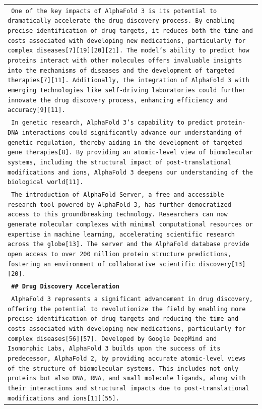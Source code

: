 \documentclass[11pt]{article}
\begin{document}
\begin{longtable}{p{\textwidth}}
\texttt{\small{ One of the key impacts of AlphaFold 3 is its potential to dramatically accelerate the drug discovery process. By enabling precise identification of drug targets, it reduces both the time and costs associated with developing new medications, particularly for complex diseases[7][19][20][21]. The model's ability to predict how proteins interact with other molecules offers invaluable insights into the mechanisms of diseases and the development of targeted therapies[7][11]. Additionally, the integration of AlphaFold 3 with emerging technologies like self-driving laboratories could further innovate the drug discovery process, enhancing efficiency and accuracy[9][11]. }} \\
\texttt{\small{ In genetic research, AlphaFold 3's capability to predict protein-DNA interactions could significantly advance our understanding of genetic regulation, thereby aiding in the development of targeted gene therapies[8]. By providing an atomic-level view of biomolecular systems, including the structural impact of post-translational modifications and ions, AlphaFold 3 deepens our understanding of the biological world[11]. }} \\
\texttt{\small{ The introduction of AlphaFold Server, a free and accessible research tool powered by AlphaFold 3, has further democratized access to this groundbreaking technology. Researchers can now generate molecular complexes with minimal computational resources or expertise in machine learning, accelerating scientific research across the globe[13]. The server and the AlphaFold database provide open access to over 200 million protein structure predictions, fostering an environment of collaborative scientific discovery[13][20]. }} \\
\vspace{1pt}
\texttt{\small{\textbf{ \#\# Drug Discovery Acceleration }}} \\
\texttt{\small{ AlphaFold 3 represents a significant advancement in drug discovery, offering the potential to revolutionize the field by enabling more precise identification of drug targets and reducing the time and costs associated with developing new medications, particularly for complex diseases[56][57]. Developed by Google DeepMind and Isomorphic Labs, AlphaFold 3 builds upon the success of its predecessor, AlphaFold 2, by providing accurate atomic-level views of the structure of biomolecular systems. This includes not only proteins but also DNA, RNA, and small molecule ligands, along with their interactions and structural impacts due to post-translational modifications and ions[11][55]. }} \\

\end{longtable}
\end{document}
